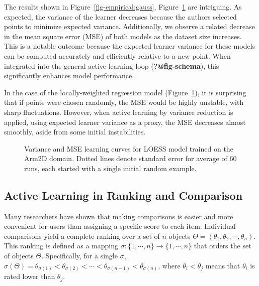 \documentclass[
  letterpaper,
  numbers=noenddot,
  DIV=11]{scrreprt}
\theoremstyle{definition}
\theoremstyle{plain}
\theoremstyle{plain}
\theoremstyle{remark}
\begin{document}
The results shown in
Figure~\ref{fig-empirical:gauss}, Figure~\ref{fig-empirical:regress} are
intriguing. As expected, the variance of the learner decreases because
the authors selected points to minimize expected variance. Additionally,
we observe a related decrease in the mean square error (MSE) of both
models as the dataset size increases. This is a notable outcome because
the expected learner variance for these models can be computed
accurately and efficiently relative to a new point. When integrated into
the general active learning loop (\textbf{?@fig-schema}), this
significantly enhances model performance.

In the case of the locally-weighted regression model
(Figure~\ref{fig-empirical:regress}), it is surprising that if points
were chosen randomly, the MSE would be highly unstable, with sharp
fluctuations. However, when active learning by variance reduction is
applied, using expected learner variance as a proxy, the MSE decreases
almost smoothly, aside from some initial instabilities.

\begin{figure}


\caption{\label{fig-empirical:regress}Variance and MSE learning curves
for LOESS model trained on the Arm2D domain. Dotted lines denote
standard error for average of 60 runs, each started with a single
initial random example.}

\end{figure}%

\subsection{Active Learning in Ranking and
Comparison}\label{active-learning-in-ranking-and-comparison}

Many researchers have shown that making comparisons is easier and more
convenient for users than assigning a specific score to each item.
Individual comparisons yield a complete ranking over a set of \(n\)
objects \(\Theta = (\theta_1, \theta_2, \cdots, \theta_n)\). This
ranking is defined as a mapping
\(\sigma : \{1, \cdots, n\} \rightarrow \{1,\cdots, n\}\) that orders
the set of objects \(\Theta\). Specifically, for a single \(\sigma\),
\(\sigma(\Theta) = \theta_{\sigma(1)} < \theta_{\sigma(2)} < \cdots < \theta_{\sigma(n-1)} < \theta_{\sigma(n)}\),
where \(\theta_{i} < \theta_{j}\) means that \(\theta_{i}\) is rated
lower than \(\theta_{j}\).
\end{document}
